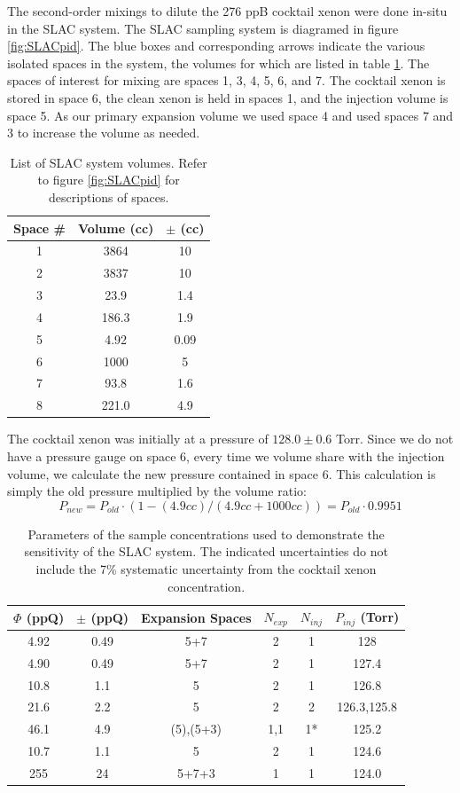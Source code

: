 The second-order mixings to dilute the 276 ppB cocktail xenon were done in-situ in the SLAC system. The SLAC sampling system is diagramed in figure \ref{fig:SLACpid}. The blue boxes and corresponding arrows indicate the various isolated spaces in the system, the volumes for which are listed in table \ref{tab:SLACvols}. The spaces of interest for mixing are spaces 1, 3, 4, 5, 6, and 7. The cocktail xenon is stored in space 6, the clean xenon is held in spaces 1, and the injection volume is space 5. As our primary expansion volume we used space 4 and used spaces 7 and 3 to increase the volume as needed.
\begin{table}[h!]
\centering
 \begin{tabular}{ c | c | c }
 \hline
 \hline
 Space \# & Volume (cc) & $\pm$ (cc) \\ 
 \hline\hline
1 & 3864 & 10 \\ 
2 & 3837 & 10 \\
3 & 23.9 & 1.4 \\
4 & 186.3 &1.9 \\
5 & 4.92 & 0.09 \\
6 & 1000 & 5 \\
7 & 93.8 & 1.6 \\
8 & 221.0 & 4.9 \\
 \hline
 \hline
\end{tabular}
\caption{List of SLAC system volumes. Refer to figure \ref{fig:SLACpid} for descriptions of spaces.}
\label{tab:SLACvols}
\end{table}

The cocktail xenon was initially at a pressure of $128.0\pm0.6$ Torr. Since we do not have a pressure gauge on space 6, every time we volume share with the injection volume, we calculate the new pressure contained in space 6. This calculation is simply the old pressure multiplied by the volume ratio:
\begin{equation}
 P_{new}=P_{old}\cdot\left(1-(4.9 cc)/(4.9 cc+1000 cc)\right)=P_{old}\cdot 0.9951
 \end{equation}
 \begin{table}[h!]
 \centering
 \begin{tabular}{ c | c | c | c | c | c}
 \hline
 \hline
 $\Phi$ (ppQ) & $\pm$ (ppQ) &  Expansion Spaces & $N_{exp}$ & $N_{inj}$ & $P_{inj}$ (Torr) \\ 
 \hline
 \hline
4.92 & 0.49 & 5+7 & 2 & 1 & 128 \\ 
4.90 & 0.49 & 5+7 & 2 & 1 & 127.4 \\ 
10.8 & 1.1 & 5 & 2 & 1 &126.8 \\
21.6 & 2.2 & 5 & 2 & 2 & 126.3,125.8 \\
46.1 & 4.9 & (5),(5+3) & 1,1 & 1* & 125.2 \\
10.7 & 1.1 & 5 & 2 & 1 & 124.6 \\
255 & 24 & 5+7+3 & 1 & 1 & 124.0 \\
 \hline
 \hline
\end{tabular}
\caption{Parameters of the sample concentrations used to demonstrate the sensitivity of the SLAC system. The indicated uncertainties do not include the 7\% systematic uncertainty from the cocktail xenon concentration.}
\label{tab:concentrations}
\end{table}

